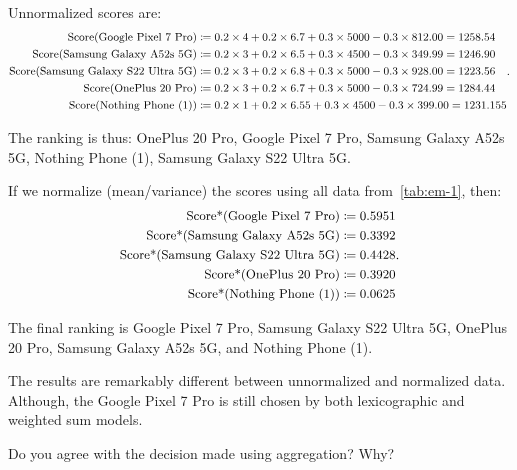 \documentclass[answers, 10pt, UKenglish]{exam}
\begin{document}
\begin{questions}
\begin{solutionorbox}
{		Unnormalized scores are:
		\[
			\small
			\begin{aligned}
				\text{Score(Google Pixel 7 Pro)} &\coloneqq 0.2\times 4 + 0.2\times 6.7 + 0.3\times 5000 - 0.3\times 812.00 = 1258.54\\
				\text{Score(Samsung Galaxy A52s 5G)} &\coloneqq 0.2\times 3 + 0.2\times 6.5 + 0.3\times 4500 - 0.3\times 349.99 = 1246.90\\
				\text{Score(Samsung Galaxy S22 Ultra 5G)} &\coloneqq 0.2\times 3 + 0.2\times 6.8 + 0.3\times 5000 - 0.3\times 928.00 = 1223.56\\
				\text{Score(OnePlus 20 Pro)} &\coloneqq 0.2\times 3 + 0.2\times 6.7 + 0.3\times 5000 - 0.3\times 724.99 = 1284.44\\
				\text{Score(Nothing Phone (1))} &\coloneqq 0.2\times 1 + 0.2\times 6.55 + 0.3\times 4500 - 0.3\times 399.00 = 1231.155\\
			\end{aligned}
		.\] 

		The ranking is thus: OnePlus 20 Pro, Google Pixel 7 Pro, Samsung Galaxy A52s 5G, Nothing Phone (1), Samsung Galaxy S22 Ultra 5G.

		If we normalize (mean/variance) the scores using all data from~\cref{tab:em-1}, then:
		\[
			\small
			\begin{aligned}
				\text{Score*(Google Pixel 7 Pro)} &\coloneqq 0.5951\\
				\text{Score*(Samsung Galaxy A52s 5G)} &\coloneqq 0.3392\\
				\text{Score*(Samsung Galaxy S22 Ultra 5G)} &\coloneqq 0.4428\\
				\text{Score*(OnePlus 20 Pro)} &\coloneqq 0.3920\\
				\text{Score*(Nothing Phone (1))} &\coloneqq 0.0625\\ 
			\end{aligned}
		.\] 

		The final ranking is Google Pixel 7 Pro, Samsung Galaxy S22
		Ultra 5G, OnePlus 20 Pro, Samsung Galaxy A52s 5G, and Nothing
		Phone (1).

		The results are remarkably different between unnormalized and
		normalized data. Although, the Google Pixel 7 Pro is still
		chosen by both lexicographic and weighted sum models. 

	}
	\end{solutionorbox}
	
	\question\label{q:5}%
	Do you agree with the decision made using aggregation? Why? 
	

\end{questions}
\end{document}
